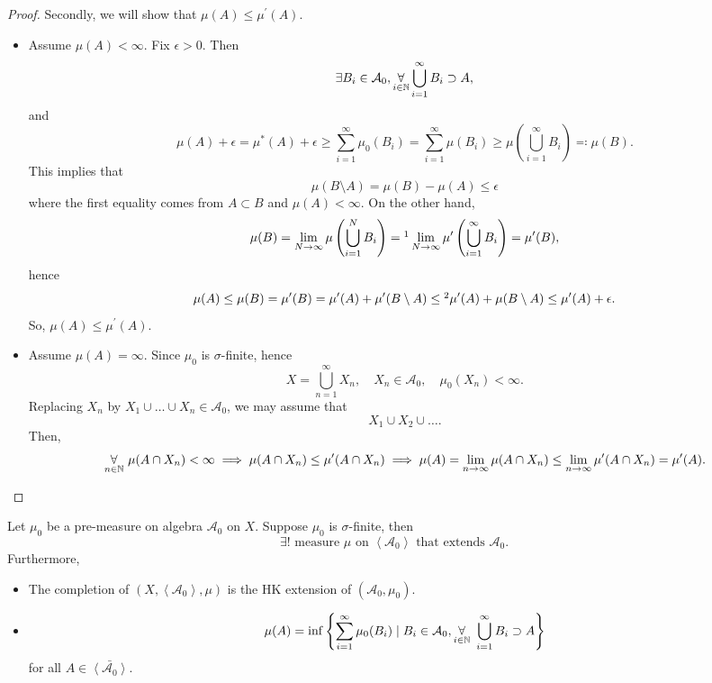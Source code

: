 \begin{proof}
	Secondly, we will show that \(\mu (A)\leq \mu ^\prime (A)\).
	\begin{itemize}
		\item Assume \(\mu (A)<\infty \). Fix \(\epsilon >0\). Then
		      \[
			      \exists B_{i}\in \mathcal{A} _0, \underset{i\in\mathbb{\MakeUppercase{N}} }{\forall} \bigcup\limits_{i=1}^{\infty} B_{i}\supset A,
		      \]
		      and
		      \[
			      \mu (A)+\epsilon = \mu ^{*} (A) + \epsilon \geq \sum\limits_{i=1}^{\infty} \mu _0(B_{i}) = \sum\limits_{i=1}^{\infty} \mu (B_{i})\geq \mu \left(\bigcup\limits_{i=1}^{\infty} B_{i}\right)\eqqcolon \mu (B).
		      \]
		      This implies that
		      \[
			      \mu (B\setminus A) = \mu (B) - \mu (A)\leq \epsilon
		      \]
		      where the first equality comes from \(A\subset B\) and \(\mu (A)<\infty \).
		      On the other hand,
		      \[
			      \mu (B) = \lim\limits_{N \to \infty} \mu \left(\bigcup\limits_{i=1}^{N} B_{i}\right) =\footnotemark \lim\limits_{N \to \infty} \mu ^\prime \left(\bigcup\limits_{i=1}^{\infty} B_{i}\right) = \mu ^\prime (B),
		      \]
		      hence
		      \[
			      \mu (A)\leq \mu (B) = \mu ^\prime (B) = \mu ^\prime (A)+\mu ^\prime (B\setminus A) \leq\footnotemark \mu ^\prime (A) + \mu (B\setminus A) \leq \mu ^\prime (A) + \epsilon .
		      \]
		      So, \(\mu (A)\leq \mu ^\prime (A)\).
		\item Assume \(\mu (A) = \infty \). Since \(\mu _0\) is \(\sigma \)-finite, hence
		      \[
			      X = \bigcup\limits_{n=1}^{\infty} X_{n},\quad X_{n}\in\mathcal{A} _0,\quad \mu _0(X_{n})<\infty.
		      \]
		      Replacing \(X_{n}\) by \(X_{1}\cup \ldots \cup X_{n} \in\mathcal{A} _0\), we may assume that
		      \[
			      X_1 \cup X_2 \cup \ldots .
		      \]
		      Then,
		      \[
			      \underset{n\in\mathbb{\MakeUppercase{N}} }{\forall}\ \mu (A \cap X_{n})<\infty \implies \mu (A\cap X_{n})\leq \mu ^\prime (A\cap X_{n})
			      \implies \mu (A) = \lim\limits_{n \to \infty} \mu (A\cap X_{n})\leq \lim\limits_{n \to \infty} \mu ^\prime (A\cap X_{n}) = \mu ^\prime (A).
		      \]
	\end{itemize}

\end{proof}

\begin{corollary}
	Let \(\mu _0\) be a pre-measure on algebra \(\mathcal{A} _0\) on \(X\). Suppose \(\mu _0\) is \(\sigma \)-finite, then
	\[
		\exists! \text{ measure \(\mu\) on \(\left< \mathcal{A} _0 \right> \) that extends \(\mathcal{A} _0\)}.
	\]
	Furthermore,
	\begin{itemize}
		\item The completion of \((X, \left< \mathcal{A} _0 \right>, \mu  )\) is the HK extension of \((\mathcal{A} _0, \mu _0)\).
		\item
		      \[
			      \mu (A) = \inf\left\{\sum\limits_{i=1}^{\infty} \mu _0(B_{i})\mid B_{i}\in \mathcal{A} _0, \underset{i\in\mathbb{\MakeUppercase{N}} }{\forall}\ \bigcup\limits_{i=1}^{\infty} B_{i}\supset A\right\}
		      \]
		      for all \(A\in \bar{\left< \mathcal{A} _0 \right> }\).
	\end{itemize}
\end{corollary}